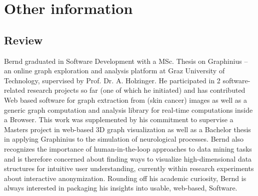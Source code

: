 \documentclass[a4paper]{twentysecondcv} %
\begin{document}
\newpage %

\makeprofile %


\section{Other information}

\subsection{Review}

Bernd graduated in Software Development with a MSc. Thesis on Graphinius – an online graph exploration and analysis platform at Graz University of Technology, supervised by Prof. Dr. A. Holzinger.
He participated in 2 software-related research projects so far (one of which he initiated) and has contributed Web based software for graph extraction from (skin cancer) images as well as a generic graph computation and analysis library for real-time computations inside a Browser. This work was supplemented by his commitment to supervise a Masters project in web-based 3D graph visualization as well as a Bachelor thesis in applying Graphinius to the simulation of neurological processes. Bernd also recognizes the importance of human-in-the-loop approaches to data mining tasks and is therefore concerned about finding ways to visualize high-dimensional data structures for intuitive user understanding, currently within research experiments about interactive anonymization. Rounding off his academic curiosity, Bernd is always interested in packaging his insights into usable, web-based, Software.



%

\end{document}
